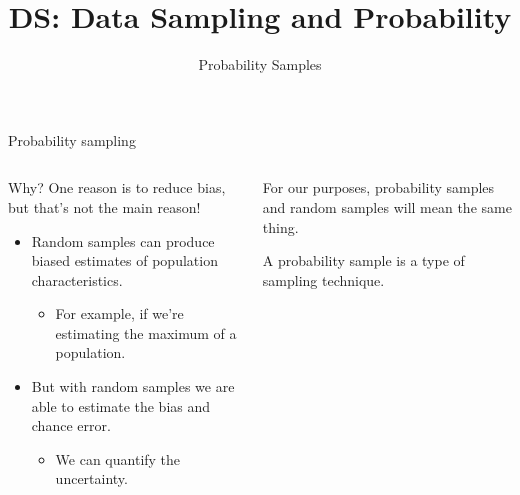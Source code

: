 \documentclass[aspectratio=169]{../latex_main/tntbeamer}  %
\title[Introduction]{DS: Data Sampling and Probability}
\subtitle{Probability Samples}
\begin{document}
	
	\maketitle
		\begin{frame}{Probability sampling}
	    \begin{columns}
	        \begin{column}{.4\textwidth}
	            Why? One reason is to reduce bias, but that’s not the main reason!
	            \begin{itemize}
	                \item Random samples can produce biased estimates of population characteristics.
	                \begin{itemize}
	                    \item For example, if we’re estimating the maximum of a population.
	                \end{itemize}
	                \item But with random samples we are able to estimate the bias and chance error.
	                \begin{itemize}
	                    \item We can quantify the uncertainty.
	                \end{itemize}
	            \end{itemize}
	        \end{column}
	        
	        \begin{column}{.5\textwidth}
	            For our purposes, probability samples and random samples will mean the same thing.
             
	            \bigskip
	            A probability sample is a type of sampling technique.
	        \end{column}
	        
	    \end{columns}
	    
	\end{frame}
	
\end{document}
